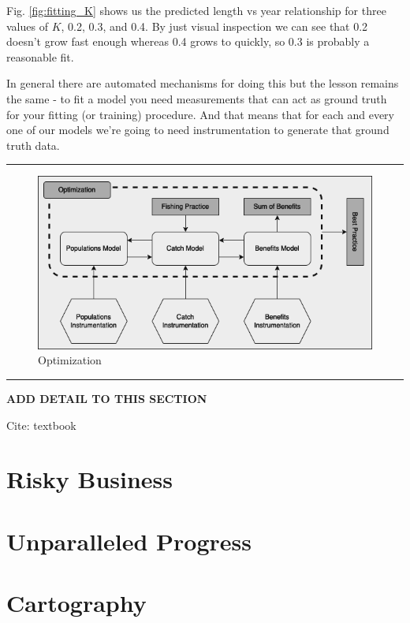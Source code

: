 \documentclass[11pt,a5paper]{book}
\begin{document}
Fig. \ref{fig:fitting_K} shows us the predicted length vs year relationship for three values of $K$, 0.2, 0.3, and 0.4. By just visual inspection we can see that 0.2 doesn't grow fast enough whereas 0.4 grows to quickly, so 0.3 is probably a reasonable fit.
\newline

In general there are automated mechanisms for doing this but the lesson remains the same - to fit a model you need measurements that can act as ground truth for your fitting (or training) procedure. And that means that for each and every one of our models we're going to need instrumentation to generate that ground truth data. 
\newpage

\noindent \rule{\textwidth}{0.5pt} 
\begin{figure}[h!] 
  \includegraphics[width=\linewidth]{drawings/high_level_optimization.png}
  \caption{Optimization}
  \label{fig:high_level_optimization}
\end{figure}
\newline
\rule{\textwidth}{0.5pt} 
\vspace{5pt}

\textbf{ADD DETAIL TO THIS SECTION}
\newpage

Cite:
textbook


\section{Risky Business}
\newpage

\section{Unparalleled Progress}
\newpage

\section{Cartography}





\end{document}
